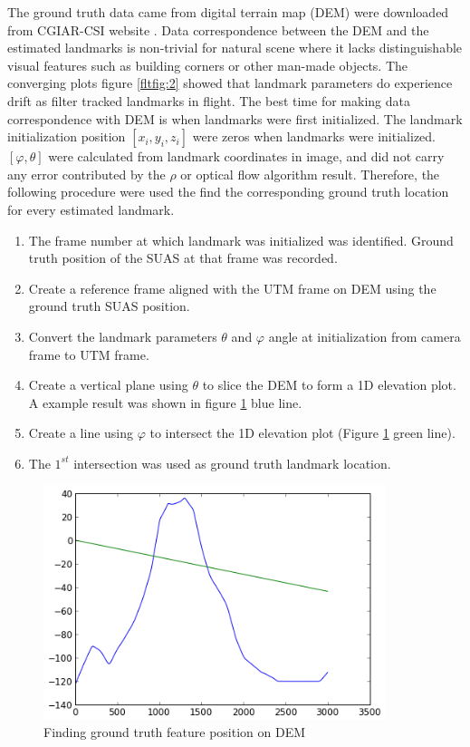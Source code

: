 The ground truth data came from digital terrain map (DEM) were
downloaded from CGIAR-CSI website \cite{_cgiar-csi_????}. Data
correspondence between the DEM and the estimated landmarks is
non-trivial for natural scene where it lacks distinguishable visual
features such as building corners or other man-made objects. The
converging plots figure \ref{fltfig:2} showed that landmark parameters
do experience drift as filter tracked landmarks in flight. The best
time for making data correspondence with DEM is when landmarks were
first initialized. The landmark initialization position $[x_i, y_i,
z_i]$ were zeros when landmarks were initialized. $[\varphi,
\theta]$ were calculated from landmark coordinates in image, and did
not carry any error contributed by the $\rho$ or optical flow
algorithm result. Therefore, the following procedure were used the find
the corresponding ground truth location for every estimated landmark.

\begin{enumerate}
  \item The frame number at which landmark was initialized was
  identified. Ground truth position of the SUAS at that frame was
  recorded.
  \item Create a reference frame aligned with the UTM frame on DEM
  using the ground truth SUAS position.
  \item Convert the landmark parameters $\theta$ and $\varphi$
  angle at initialization from camera frame to UTM frame. 
  \item Create a vertical plane using $\theta$ to slice the DEM to
  form a 1D elevation plot. A example result was shown in figure
  \ref{fltfig:7} blue line.
  \item Create a line using $\varphi$ to intersect the 1D elevation plot
  (Figure \ref{fltfig:7} green line). 
  \item The $1^{st}$ intersection was used as ground truth landmark
  location.
\end{enumerate}

\begin{figure}[h]
\centering
\includegraphics[width=10cm, keepaspectratio=true]
{./Figures/fltfig/cut1/intersect0_0.png}
\caption{Finding ground truth feature position on DEM}
\label{fltfig:7}
\end{figure}

